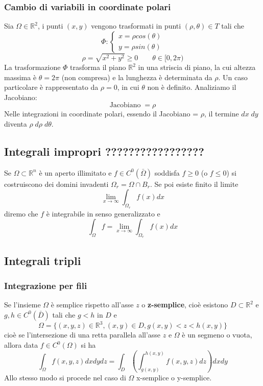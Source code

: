 \subsubsection{Cambio di variabili in coordinate polari}
Sia $\Omega \in \mathbb{R}^2$, i punti $(x,y)$ vengono trasformati in punti $(\rho, \theta) \in T$ tali che
\[
    \Phi : \begin{cases}
        x = \rho cos(\theta)\\
        y =\rho sin(\theta)
    \end{cases}
\]
\[
    \rho = \sqrt{x^2 +y^2} \geq 0 \quad \quad \theta \in[0, 2\pi)
\]
La trasformazione $\Phi$ trasforma il piano $\mathbb{R}^2$ in una striscia di piano, la cui altezza massima è $\theta = 2\pi$ (non compresa) e la lunghezza è determinata da $\rho$.\newline
\newline
Un caso particolare è rappresentato da $\rho = 0$, in cui $\theta$ non è definito.\newline
\newline
Analiziamo il Jacobiano:
\[
    \text{Jacobiano}\;= \rho
\]
Nelle integrazioni in coordinate polari, essendo il Jacobiano = $\rho$, il termine $dx \; dy$ diventa $\rho \; d \rho \; d \theta$.
\subsection{Integrali impropri ?????????????????}
Se $\Omega \subset \mathbb{R}^n$ è un aperto illimitato e $f \in C^0(\bar{\Omega})$ soddisfa $f \geq 0$ (o $f\leq 0$) si costruiscono dei domini invadenti $\Omega_r = \Omega \cap B_r$. Se poi esiste finito il limite 
\[
    \lim_{x\rightarrow \infty} \int_{\Omega_r} f(x) dx
\]
diremo che $f$ è integrabile in senso generalizzato e
\[
    \int_\Omega f = \lim_{x\rightarrow \infty} \int_{\Omega_r} f(x) dx
\]
\subsection{Integrali tripli}
\subsubsection{Integrazione per fili}
Se l'insieme $\Omega$ è semplice rispetto all'asse $z$ o \textbf{z-semplice}, cioè esistono $D \subset \mathbb{R}^2$ e $g,h \in C^0(\bar{D})$ tali che $g<h$ in $D$ e
\[
    \Omega = \{(x,y,z) \in \mathbb{R}^3, (x,y)\in D, g(x,y)<z<h(x,y)\}
\]
cioè se l'intersezione di una retta parallela all'asse $z$ e $\Omega$ è un segmeno o vuota, allora data $f \in C^0(\Omega)$ si ha
\[
    \int_\Omega f(x,y,z) dxdydz = \int_D\left(\int_{g(x,y)}^{h(x,y)}f(x,y,z) dz\right)dxdy
\] 
Allo stesso modo si procede nel caso di $\Omega$ x-semplice o y-semplice.
